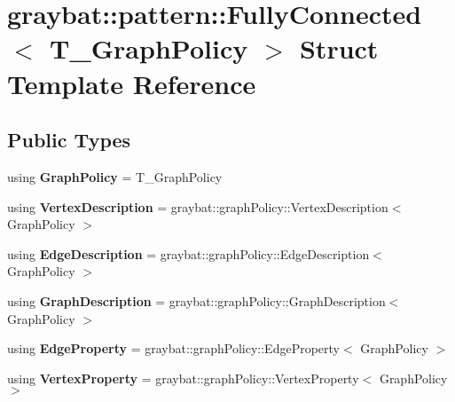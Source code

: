 \hypertarget{structgraybat_1_1pattern_1_1FullyConnected}{}\section{graybat\+:\+:pattern\+:\+:Fully\+Connected$<$ T\+\_\+\+Graph\+Policy $>$ Struct Template Reference}
\label{structgraybat_1_1pattern_1_1FullyConnected}
\subsection*{Public Types}
\begin{DoxyCompactItemize}
\item 
\hypertarget{structgraybat_1_1pattern_1_1FullyConnected_a327ae23d2f3edf120a9c798f491baa0b}{}using {\bfseries Graph\+Policy} = T\+\_\+\+Graph\+Policy\label{structgraybat_1_1pattern_1_1FullyConnected_a327ae23d2f3edf120a9c798f491baa0b}

\item 
\hypertarget{structgraybat_1_1pattern_1_1FullyConnected_a6725ad52f252aaebb793908d72868076}{}using {\bfseries Vertex\+Description} = graybat\+::graph\+Policy\+::\+Vertex\+Description$<$ Graph\+Policy $>$\label{structgraybat_1_1pattern_1_1FullyConnected_a6725ad52f252aaebb793908d72868076}

\item 
\hypertarget{structgraybat_1_1pattern_1_1FullyConnected_ae0310e022530b83489a8f9ca7fc7478f}{}using {\bfseries Edge\+Description} = graybat\+::graph\+Policy\+::\+Edge\+Description$<$ Graph\+Policy $>$\label{structgraybat_1_1pattern_1_1FullyConnected_ae0310e022530b83489a8f9ca7fc7478f}

\item 
\hypertarget{structgraybat_1_1pattern_1_1FullyConnected_ae729a9c819f7209416ff95b93ab3a8a3}{}using {\bfseries Graph\+Description} = graybat\+::graph\+Policy\+::\+Graph\+Description$<$ Graph\+Policy $>$\label{structgraybat_1_1pattern_1_1FullyConnected_ae729a9c819f7209416ff95b93ab3a8a3}

\item 
\hypertarget{structgraybat_1_1pattern_1_1FullyConnected_ae068dc5e99ae629d1d5f14c2f7774631}{}using {\bfseries Edge\+Property} = graybat\+::graph\+Policy\+::\+Edge\+Property$<$ Graph\+Policy $>$\label{structgraybat_1_1pattern_1_1FullyConnected_ae068dc5e99ae629d1d5f14c2f7774631}

\item 
\hypertarget{structgraybat_1_1pattern_1_1FullyConnected_a5e04b1b207ca8ff61a918dc30e4911dd}{}using {\bfseries Vertex\+Property} = graybat\+::graph\+Policy\+::\+Vertex\+Property$<$ Graph\+Policy $>$\label{structgraybat_1_1pattern_1_1FullyConnected_a5e04b1b207ca8ff61a918dc30e4911dd}

\end{DoxyCompactItemize}
